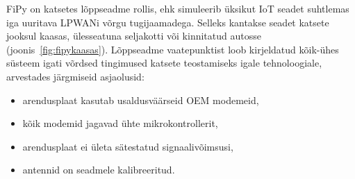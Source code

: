 \documentclass[12pt]{article}
\begin{document}
    FiPy on katsetes lõppseadme rollis, ehk simuleerib üksikut IoT seadet suhtlemas iga uuritava LPWANi võrgu tugijaamadega.
    Selleks kantakse seadet katsete jooksul kaasas, ülesseatuna seljakotti või kinnitatud autosse (joonis~\ref{fig:fipykaasas}).
    Lõppseadme vaatepunktist loob kirjeldatud kõik-ühes süsteem igati võrdsed tingimused katsete teostamiseks igale tehnoloogiale, arvestades järgmiseid asjaolusid:
    \begin{itemize}
        \item arendusplaat kasutab usaldusväärseid OEM modemeid,
        \item kõik modemid jagavad ühte mikrokontrollerit,
        \item arendusplaat ei ületa sätestatud signaalivõimsusi,
        \item antennid on seadmele kalibreeritud.
    \end{itemize}
\end{document}
